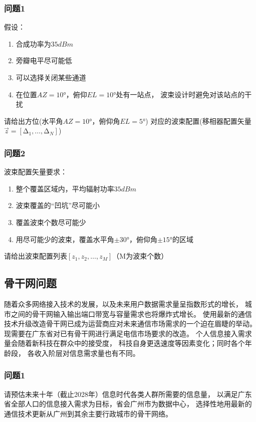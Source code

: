 \documentclass[UTF8,12pt]{ctexart}
\begin{document}
        \subsubsection{问题1}
            假设：\begin{enumerate}
                \item 合成功率为$35dBm$
                \item 旁瓣电平尽可能低
                \item 可以选择关闭某些通道
                \item 在位置$AZ=10°$，俯仰$EL=10°$处有一站点，
                    波束设计时避免对该站点的干扰
            \end{enumerate}
            请给出方位(水平角$AZ=10°$，俯仰角$EL=5°$)
            对应的波束配置(移相器配置矢量$\vec{z}=[∆_1,…,∆_N]$)
        \subsubsection{问题2}
            波束配置矢量要求：
                \begin{enumerate}
                    \item 整个覆盖区域内，平均辐射功率$35dBm$
                    \item 波束覆盖的“凹坑”尽可能小
                    \item 覆盖波束个数尽可能少
                    \item 用尽可能少的波束，覆盖水平角$±30°$，俯仰角$±15°$的区域
                \end{enumerate}
            请给出波束配置列表$[z_1,z_2,…,z_M]$（M为波束个数）
    \subsection{骨干网问题}
        随着众多网络接入技术的发展，以及未来用户数据需求量呈指数形式的增长，
        城市之间的骨干网输入输出端口带宽与容量需求也将爆炸式增长。
        使用最新的通信技术升级改造骨干网已成为运营商应对未来通信市场需求的一个迫在眉睫的举动。
        现需要在广东省对已有骨干网进行满足电信市场要求的改造。
        个人信息接入需求量会随着新科技在群众中的接受度，
        科技自身更迭速度等因素变化；同时各个年龄段，
        各收入阶层对信息需求量也有不同。
        \subsubsection{问题1}
            请预估未来十年（截止2028年）信息时代各类人群所需要的信息量，
            以满足广东省全部人口的信息接入需求为目标，省会广州市为数据中心，
            选择性地用最新的通信技术更新从广州到其余主要行政城市的骨干网络。
\end{document}
